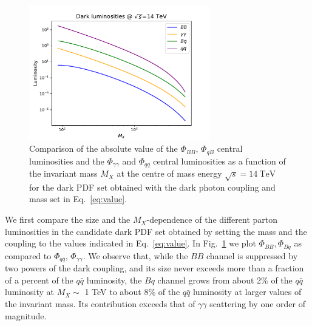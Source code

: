 \documentclass[withindex,glossary]{cam-thesis}
\begin{document}
%
\begin{figure}[tb]
\centering
\includegraphics[width=0.7\textwidth]{darkphoton_figures/vhigh_BB_gmgm_luminosity_14TeV.pdf}
\caption{Comparison of the absolute value of the $\Phi_{BB}$,
  $\Phi_{qB}$ central luminosities and the $\Phi_{\gamma\gamma}$  and
  $\Phi_{qq}$ central luminosities as a function of the invariant mass $M_X$
  at the centre of mass energy $\sqrt{s} = 14\ \text{TeV}$ for the dark PDF set obtained with 
 the dark photon coupling and mass set in Eq.~\eqref{eq:value}.%
}
\label{fig:lowdarkmass}
\end{figure}
%
We first compare the size and the $M_X$-dependence of the different
parton luminosities in the candidate dark PDF set obtained by setting the mass and the coupling to the
values indicated in Eq.~\eqref{eq:value}. In Fig.~\ref{fig:lowdarkmass} we plot $\Phi_{BB},
\Phi_{Bq}$ as compared to $\Phi_{q\bar{q}}$,
$\Phi_{\gamma\gamma}$. We
observe that, while the $BB$ channel is suppressed by two powers of
the dark coupling, and its size never exceeds more than a fraction of a percent of the
$q\bar{q}$ luminosity, the $Bq$ channel grows from about 2\% of the
$q\bar{q}$ luminosity at $M_X\sim$ 1 TeV to about 8\% of the
$q\bar{q}$ luminosity at larger values of the invariant mass. Its
contribution exceeds that of $\gamma\gamma$ scattering by one order of magnitude. 
\end{document}
